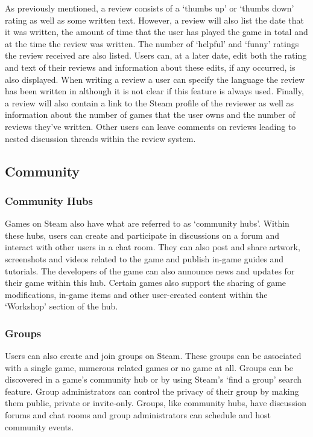 As previously mentioned, a review consists of  a `thumbs up' or `thumbs down' rating as well as some written text. However, a review will also list the date that it was written, the amount of time that the user has played the game in total and at the time the review was written. The number of `helpful' and `funny' ratings the review received are also listed. Users can, at a later date, edit both the rating and text of their reviews and information about these edits, if any occurred, is also displayed. When writing a review a user can specify the language the review has been written in although it is not clear if this feature is always used. Finally, a review will also contain a link to the Steam profile of the reviewer as well as information about the number of games that the user owns and the number of reviews they've written. Other users can leave comments on reviews leading to nested discussion threads within the review system.

\subsection{Community}

\subsubsection{Community Hubs}

Games on Steam also have what are referred to as `community hubs'. Within these hubs, users can create and participate in discussions on a forum and interact with other users in a chat room. They can also post and share artwork, screenshots and videos related to the game and publish in-game guides and tutorials. The developers of the game can also announce news and updates for their game within this hub. Certain games also support the sharing of game modifications, in-game items and other user-created content within the `Workshop' section of the hub.

\subsubsection{Groups}

Users can also create and join groups on Steam. These groups can be associated with a single game, numerous related games or no game at all. Groups can be discovered in a game's community hub or by using Steam's `find a group' search feature. Group administrators can control the privacy of their group by making them public, private or invite-only. Groups, like community hubs, have discussion forums and chat rooms and group administrators can schedule and host community events.

